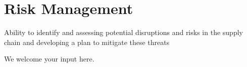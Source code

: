 \section{Risk Management}\label{sec:ekgmm-a-3-2}

Ability to identify and assessing potential disruptions and risks in the supply chain and developing a plan to mitigate these threats

We welcome your input here.

